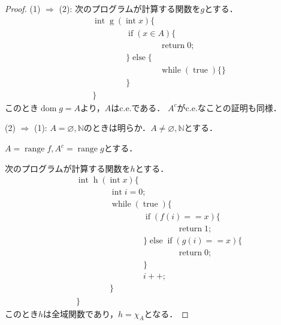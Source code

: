 \documentclass[uplatex]{jsarticle}
\newcommand{\N}{\mathbb{N}}
\newcommand{\range}{\operatorname{range}}
\newcommand{\dom}{\operatorname{dom}}
\theoremstyle{definition} %
\begin{document}
\begin{proof}
(1) $\Rightarrow$ (2): 次のプログラムが計算する関数を$g$とする．
\begin{align*}
&\operatorname{int} \operatorname{g}(\operatorname{int} x) \{ \\
&\hspace{4em}\operatorname{if} (x \in A) \{ \\
&\hspace{4em}\hspace{4em}\operatorname{return} 0; \\
&\hspace{4em}\} \operatorname{else} \{ \\
&\hspace{4em}\hspace{4em}\operatorname{while}(\operatorname{true})\{\} \\
&\hspace{4em}\} \\
&\}
\end{align*}
このとき$\dom g = A$より，$A$はc.e.である．
$A^c$がc.e.なことの証明も同様．

(2) $\Rightarrow$ (1): $A = \varnothing, \N$のときは明らか．$A \neq \varnothing, \N$とする．

$A = \range f, A^c = \range g$とする．

次のプログラムが計算する関数を$h$とする．
\begin{align*}
&\operatorname{int} \operatorname{h}(\operatorname{int} x) \{ \\
&\hspace{4em}\operatorname{int} i = 0; \\
&\hspace{4em}\operatorname{while}(\operatorname{true}) \{ \\
&\hspace{4em}\hspace{4em}\operatorname{if}(f(i)==x) \{ \\
&\hspace{4em}\hspace{4em}\hspace{4em}\operatorname{return} 1; \\
&\hspace{4em}\hspace{4em}\} \operatorname{else} \operatorname{if} (g(i) == x) \{ \\
&\hspace{4em}\hspace{4em}\hspace{4em}\operatorname{return} 0; \\
&\hspace{4em}\hspace{4em}\} \\
&\hspace{4em}\hspace{4em}i ++; \\
&\hspace{4em}\} \\
&\}
\end{align*}
このとき$h$は全域関数であり，$h = \chi_A$となる．
\end{proof}
\end{document}
